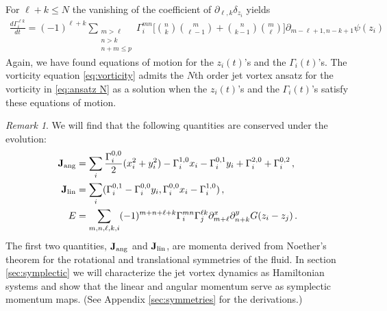 \documentclass[12pt]{amsart}
\theoremstyle{remark}
\newtheorem{rmk}[thm]{Remark}
\begin{document}
For $\ell+k \leq N$ the vanishing of the coefficient of $\partial_{\ell,k} \delta_{z_i}$ yields
\begin{align*}
 \frac{d\Gamma_i^{\ell k}}{dt} = (-1)^{\ell + k}
  \sum_{
    \substack{
      m > \ell \\
      n > k \\
      n+m \leq p}
    }\Gamma_i^{mn} \Bigg[  \binom{n}{k} \binom{m}{\ell-1} +  \binom{n}{k-1} \binom{m}{\ell} \Bigg] \partial_{m-\ell+1,n-k+1} \psi(z_i) 
\end{align*}
Again, we have found equations of motion for the $z_i(t)$'s and the $\Gamma_i(t)$'s.
The vorticity equation \eqref{eq:vorticity} admits the $N$th order jet vortex ansatz for the vorticity in \eqref{eq:ansatz N} as a solution when the $z_i(t)$'s and the $\Gamma_i(t)$'s satisfy these equations of motion.

\begin{rmk} \label{rmk:conserved}
  We will find that the following quantities are conserved under the evolution:%
  \begin{align*}
	  {\bf J}_{\rm ang} &= \sum_i \frac{\Gamma^{0,0}_i}{2} (x_i^2 + y_i^2) - \Gamma_i^{1,0} x_i - \Gamma_i^{0,1} y_i + \Gamma_i^{2,0} + \Gamma_i^{0,2} \,, \\
	  {\bf J}_{\rm lin} &= \sum_i ( \Gamma_i^{0,1} - \Gamma^{0,0}_i y_i , \Gamma^{0,0}_i x_i -\Gamma^{1,0}_i ) \,, \\
	  E &= \sum_{m,n,\ell,k,i} (-1)^{m+n+\ell +k} \Gamma^{mn}_i \Gamma_j^{\ell k} \partial_{m+\ell}^x \partial_{n+k}^y G(z_i-z_j)\,.
  \end{align*}
  The first two quantities, ${\bf J}_{\rm ang}$ and ${\bf J}_{\rm lin}$, are momenta derived from Noether's theorem for the rotational and translational symmetries of the fluid.
  In section \ref{sec:symplectic} we will characterize the jet vortex dynamics as Hamiltonian systems and show that the linear and angular momentum serve as symplectic momentum maps. (See Appendix \ref{sec:symmetries} for the derivations.)
\end{rmk}
\end{document}
